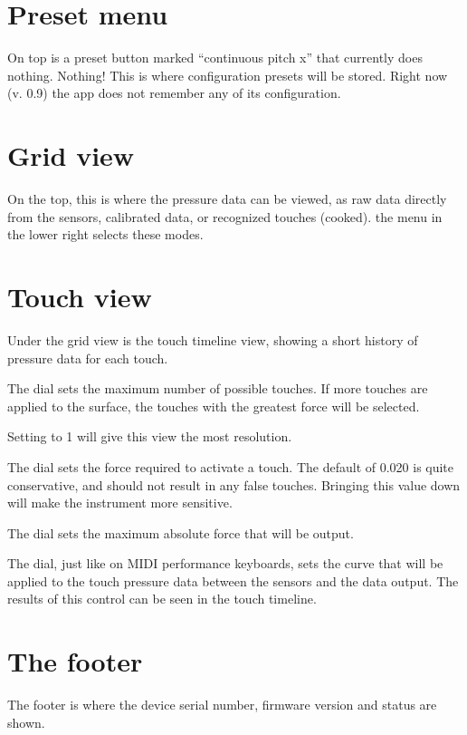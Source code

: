 \section{Preset menu}

On top is a preset button marked “continuous pitch x” that currently does nothing.  Nothing!  This is where configuration presets will be stored.  Right now (v. 0.9) the app does not remember any of its configuration.  

\section{Grid view}

On the top, this is where the pressure data can be viewed, as raw data directly from the sensors, calibrated data, or recognized touches (cooked).  the menu in the lower right selects these modes.  

\section{Touch view}

Under the grid view is the touch timeline view, showing a short history of pressure data for each touch.  

The   dial sets the maximum number of possible touches.  If more touches are applied to the surface, the touches with the greatest force will be selected. 

Setting   to 1 will give this view the most resolution.

The  dial sets the force required to activate a touch.  The default of 0.020 is quite conservative, and should not result in any false touches.  Bringing this value down will make the instrument more sensitive.

The  dial sets the maximum absolute force that will be output.  

The  dial, just like on MIDI performance keyboards, sets the curve that will be applied to the touch pressure data between the sensors and the data output.  The results of this control can be seen in the touch timeline. 

\section{The footer}

The footer is where the device serial number, firmware version and status are shown. 


